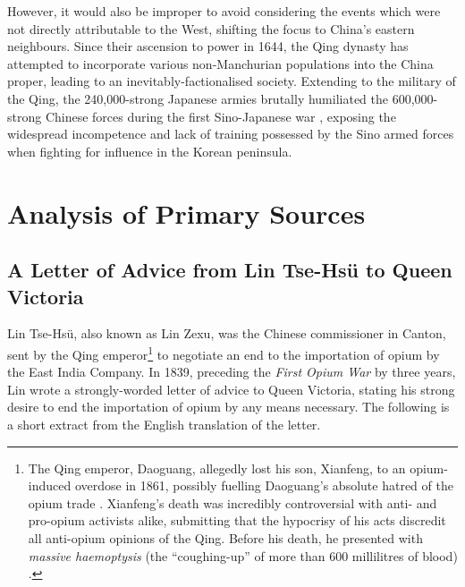 \documentclass{article}
\begin{document}
However, it would also be improper to avoid considering the events which were not directly attributable to the West, shifting the focus to China's eastern neighbours. Since their ascension to power in 1644, the Qing dynasty has attempted to incorporate various non-Manchurian populations into the China proper, leading to an inevitably-factionalised society. Extending to the military of the Qing, the 240,000-strong Japanese armies brutally humiliated the 600,000-strong Chinese forces during the first Sino-Japanese war
\autocite{Fenby:2013}, exposing the widespread incompetence and lack of training possessed by the Sino armed forces
\autocite{Jowett:2013} when fighting for influence in the Korean peninsula.

\section{Analysis of Primary Sources}

\subsection{A Letter of Advice from Lin Tse-Hs\"u to Queen Victoria}

Lin Tse-Hs\"u, also known as Lin Zexu, was the Chinese commissioner in Canton, sent by the Qing emperor\footnote{The Qing emperor, Daoguang, allegedly lost his son, Xianfeng, to an opium-induced overdose in 1861, possibly fuelling Daoguang's absolute hatred of the opium trade
\autocite{Ringmar:2013}. Xianfeng's death was incredibly controversial with anti- and pro-opium activists alike, submitting that the hypocrisy of his acts discredit all anti-opium opinions of the Qing. Before his death, he presented with \textit{massive haemoptysis} (the ``coughing-up'' of more than 600 millilitres of blood)
\autocite{Sabatine:2013}.} to negotiate an end to the importation of opium by the East India Company. In 1839, preceding the \textit{First Opium War} by three years, Lin wrote a strongly-worded letter of advice to Queen Victoria, stating his strong desire to end the importation of opium by any means necessary. The following is a short extract from the English translation of the letter.

\end{document}
